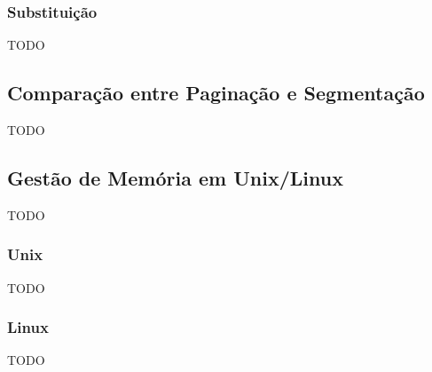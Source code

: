\documentclass[11pt]{article}
\begin{document}
\subsubsection{Substituição}

TODO

\subsection{Comparação entre Paginação e Segmentação}

TODO

\subsection{Gestão de Memória em Unix/Linux}

TODO

\subsubsection{Unix}

TODO

\subsubsection{Linux}

TODO
\end{document}
